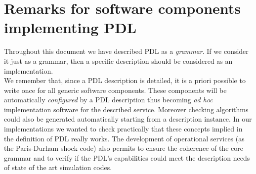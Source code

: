 \documentclass[a4paper,11pt] {ivoa}
\begin{document}
\section{Remarks for software components implementing PDL}\label{SoftwareImplementation}
Throughout this document we have described PDL as a {\it grammar}. 
If we consider it just as a grammar, then a specific description should be considered as an implementation.\\ 
We remember that, since a PDL description is detailed, it is {a priori} possible to write once for all generic software components. These components will be automatically {\it configured} by a PDL description thus becoming {\it ad hoc} implementation software for the described service. Moreover checking algorithms could also be generated automatically starting from a description instance.
In our implementations we wanted to check practically that these concepts implied in the definition of PDL really works. 
The development of operational services (as the Paris-Durham shock code) also permits to ensure the coherence of the core grammar and to verify if the PDL's capabilities could meet the description needs of state of the art simulation codes.
\end{document}

